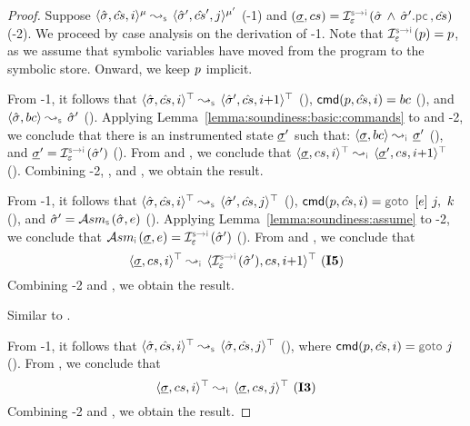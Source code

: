 \begin{proof}
{Suppose $\abssemrule{\sstate, \scs, i}{\sstate', \scs', j}{\mode}{\mode'}{\symbolic}$ (\hyp{1}) and 
$(\istate, \cs) = \interpret{\symbinst}{\senv}(\sstate \, \wedge \, \sstate'.\pcsel, \scs)$ (\hyp{2})}.
We proceed by case analysis on the derivation of \hyp{1}. Note that $\interpret{\symbinst}{\senv}(\prog) = \prog$, as we assume that symbolic variables have moved from the program to the symbolic store. Onward, we keep $p$ implicit.
\vspace{3pt}

\noindent {} 
From \hyp{1}, it follows that $\abssemrule{\sstate, \scs, i}{\sstate', \scs, i{+}1}{\top}{\top}{\symbolic}$ (), 
$\ccmd[\prog][\scs]{i} = \bcmd$ (), and $\absbsemrule{\sstate, \bcmd}{\sstate'}{\symbolic}$ (). 
Applying Lemma~\ref{lemma:soundiness:basic:commands} to  and \hyp{2}, we conclude that 
there is an instrumented state $\underline{\sigma}'$ such that: 
$\absbsemrule{\istate, \bcmd}{\istate'}{\instrumented}$ (), and $\istate' = \interpret{\symbinst}{\senv}(\sstate')$ (). 
From  and , we conclude that $\abssemrule{\istate, \cs, i}{\istate', \cs, i{+}1}{\top}{\top}{\instrumented}$ (). 
 Combining \hyp{2}, , and , we obtain the result.  
 \vspace{5pt}

\noindent {} 
From \hyp{1}, it follows that $\abssemrule{\sstate, \scs, i}{\sstate', \scs, j}{\top}{\top}{\symbolic}$ (), 
$\ccmd[\prog][\scs]{i} =  \ifgoto{\jsilexpr}{j}{k}$ (), and 
$ \sstate' = \absassume{\symbolic}(\sstate, \jsilexpr)$ (). 
Applying Lemma~\ref{lemma:soundiness:assume} to 
\hyp{2}, we conclude that 
$ \absassume{\instrumented}(\istate, \jsilexpr) = \interpret{\symbinst}{\senv}(\sstate')$ (). 
From  and , we conclude that 
$$\abssemrule{\istate, \cs, i}{\interpret{\symbinst}{\senv}(\sstate'), \cs, i{+}1}{\top}{\top}{\instrumented} \text{ (\ieq{5})}$$
Combining \hyp{2} and , we obtain the result.     
 \vspace{5pt}

\noindent {} Similar to . 
 \vspace{5pt}
 
\noindent {} From \hyp{1}, it follows that $\abssemrule{\sstate, \scs, i}{\sstate, \scs, j}{\top}{\top}{\symbolic}$ (),   
where $\ccmd[\prog][\scs]{i} = \goto \, j$ (). 
From , we conclude that 
$$\abssemrule{\istate, \cs, i}{\istate, \cs, j}{\top}{\top}{\instrumented} \text{ (\ieq{3})}$$
Combining \hyp{2} and , we obtain the result. 
 \vspace{3pt}
 

\end{proof}
